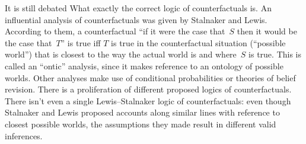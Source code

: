 \documentclass[../../../include/open-logic-section]{subfiles}
\begin{document}
It is still debated What exactly the correct logic of counterfactuals
is. An influential analysis of counterfactuals was given by Stalnaker
and Lewis.  According to them, a counterfactual ``if it were the case
that~$S$ then it would be the case that~$T$'' is true iff $T$ is true
in the counterfactual situation (``possible world'') that is closest
to the way the actual world is and where~$S$ is true. This is called
an ``ontic'' analysis, since it makes reference to an ontology of
possible worlds. Other analyses make use of conditional probabilities
or theories of belief revision.  There is a proliferation of different
proposed logics of counterfactuals. There isn't even a single
Lewis--Stalnaker logic of counterfactuals: even though Stalnaker and
Lewis proposed accounts along similar lines with reference to closest
possible worlds, the assumptions they made result in different valid
inferences.
\end{document}
